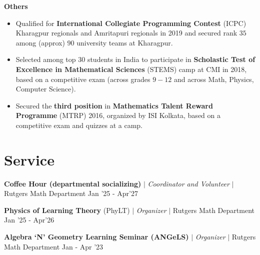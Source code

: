 \vspace{\gap}
\resumeProjectHeading
{\textbf{Others}}
{}
{
\item 
\begin{itemize}[itemsep=-4pt, parsep=5pt, leftmargin=0.5cm]
\item {}  Qualified for \textbf{International Collegiate Programming Contest} (ICPC) Kharagpur regionals and Amritapuri regionals in 2019 and secured rank $35$ among (approx) $90$ university teams at Kharagpur.
        \item Selected among top $30$ students in India to participate in \textbf{Scholastic Test of Excellence in Mathematical Sciences} (STEMS) camp at CMI in 2018, based on a competitive exam (across grades $9-12$ and across Math, Physics, Computer Science).
        \item Secured the \textbf{third position} in \textbf{Mathematics Talent Reward Programme} (MTRP) 2016, organized by ISI Kolkata, based on a competitive exam and quizzes at a camp.
\end{itemize}}
\resumeSubHeadingListEnd









\section{Service}
\resumeSubHeadingListStart


\resumeProjectHeading
{\textbf{Coffee Hour (departmental socializing)} $|$ \textit{Coordinator and Volunteer} $|$ Rutgers Math Department}
{Jan '25 - Apr'27}
{}
\vspace{\mygap}

\resumeProjectHeading
{\textbf{Physics of Learning Theory} (PhyLT) $|$ \textit{Organizer} $|$ Rutgers Math Department}
{Jan '25 - Apr'26}
{}
\vspace{\mygap}

\resumeProjectHeading
{\textbf{Algebra `N' Geometry Learning Seminar (ANGeLS)} $|$ \textit{Organizer} $|$ Rutgers Math Department}
{Jan - Apr '23}
{}
\vspace{\mygap}

